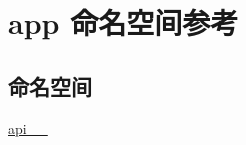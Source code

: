 \hypertarget{namespaceapp}{}\section{app 命名空间参考}
\label{namespaceapp}
\subsection*{命名空间}
\begin{DoxyCompactItemize}
\item 
 \hyperlink{namespaceapp_1_1api__1__0}{api\+\_\+\_}
\end{DoxyCompactItemize}
